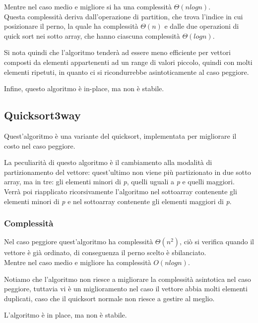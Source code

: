 \documentclass{article}
\begin{document}
            Mentre nel caso medio e migliore si ha una complessità $\Theta(nlogn)$.\\
            Questa complessità deriva dall'operazione di partition, che trova l'indice in cui posizionare il perno, la quale ha complessità $\Theta(n)$ e dalle due operazioni di quick sort nei sotto array, che hanno ciascuna complessità $\Theta(logn)$.
            
            Si nota quindi che l'algoritmo tenderà ad essere meno efficiente per vettori composti da elementi appartenenti ad un range di valori piccolo, quindi con molti elementi ripetuti, in quanto ci si ricondurrebbe asintoticamente al caso peggiore.
            
            Infine, questo algoritmo è in-place, ma non è stabile.

    \subsection{Quicksort3way}
        Quest'algoritmo è una variante del quicksort, implementata per migliorare il costo nel caso peggiore.
        
        La peculiarità di questo algoritmo è il cambiamento alla modalità di partizionamento del vettore: quest'ultimo non viene più partizionato in due sotto array, ma in tre: gli elementi minori di \textit{p}, quelli uguali a \textit{p} e quelli maggiori.\\
        Verrà poi riapplicato ricorsivamente l'algoritmo nel sottoarray contenente gli elementi minori di \textit{p} e nel sottoarray contenente gli elementi maggiori di \textit{p}.

        \subsubsection{Complessità}
            Nel caso peggiore quest'algoritmo ha complessità $\Theta(n^2)$, ciò si verifica quando il vettore è già ordinato, di conseguenza il perno scelto è sbilanciato.\\
            Mentre nel caso medio e migliore ha complessità $O(nlogn)$.
            
            Notiamo che l'algoritmo non riesce a migliorare la complessità asintotica nel caso peggiore, tuttavia vi è un miglioramento nel caso il vettore abbia molti elementi duplicati, caso che il quicksort normale non riesce a gestire al meglio.
            
            L'algoritmo è in place, ma non è stabile.\\
\end{document}
